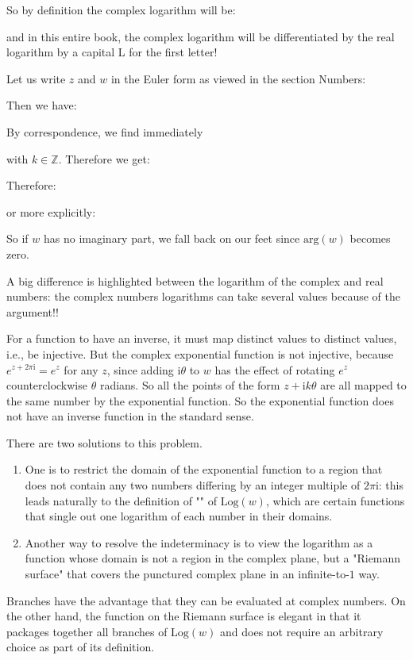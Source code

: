 	So by definition the complex logarithm will be:
	
	and in this entire book, the complex logarithm will be differentiated by the real logarithm by a capital L for the first letter!
	
	Let us write $z$ and $w$ in the Euler form as viewed in the section Numbers:
	
	Then we have:
	
	By correspondence, we find immediately
	
	with $k \in \mathbb{Z}$. Therefore we get:
	
	Therefore:
	
	or more explicitly:
	
	So if $w$ has no imaginary part, we fall back on our feet since $\text{arg} (w)$ becomes zero.
	
	A big difference is highlighted between the logarithm of the complex and real numbers: the complex numbers logarithms can take several values because of the argument!!
	
	For a function to have an inverse, it must map distinct values to distinct values, i.e., be injective. But the complex exponential function is not injective, because $e^{z+2\pi \mathrm{i} }= e^z$ for any $z$, since adding $\mathrm{i}\theta$ to $w$ has the effect of rotating $e^z$ counterclockwise $\theta$ radians. So all the points of the form $z+\mathrm{i}k\theta$  are all mapped to the same number by the exponential function. So the exponential function does not have an inverse function in the standard sense.
	
	There are two solutions to this problem.
	
	\begin{enumerate}
		\item One is to restrict the domain of the exponential function to a region that does not contain any two numbers differing by an integer multiple of $2\pi \mathrm{i}$: this leads naturally to the definition of "" of $\text{Log}(w)$, which are certain functions that single out one logarithm of each number in their domains.
		
		\item Another way to resolve the indeterminacy is to view the logarithm as a function whose domain is not a region in the complex plane, but a "Riemann surface" that covers the punctured complex plane in an infinite-to-$1$ way.
	\end{enumerate}
	Branches have the advantage that they can be evaluated at complex numbers. On the other hand, the function on the Riemann surface is elegant in that it packages together all branches of $\text{Log}(w)$ and does not require an arbitrary choice as part of its definition.
	
